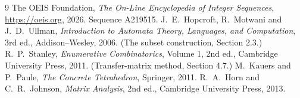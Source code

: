 \documentclass[11pt,a4paper]{article}
\theoremstyle{plain}
\theoremstyle{definition}
\begin{document}
\begin{thebibliography}{9}
 The OEIS Foundation, \emph{The On-Line Encyclopedia of Integer
Sequences}, \url{https://oeis.org}, 2026. Sequence A219515.
 J.~E.~Hopcroft, R.~Motwani and J.~D.~Ullman, \emph{Introduction to Automata
Theory, Languages, and Computation}, 3rd ed., Addison--Wesley, 2006. (The subset
construction, Section 2.3.)
 R.~P.~Stanley, \emph{Enumerative Combinatorics}, Volume 1, 2nd ed.,
Cambridge University Press, 2011. (Transfer-matrix method, Section 4.7.)
 M.~Kauers and P.~Paule, \emph{The Concrete Tetrahedron}, Springer, 2011.
 R.~A.~Horn and C.~R.~Johnson, \emph{Matrix Analysis}, 2nd ed., Cambridge
University Press, 2013.
\end{thebibliography}
\end{document}
